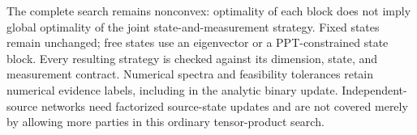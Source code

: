 The complete search remains nonconvex: optimality of each block does not
imply global optimality of the joint state-and-measurement strategy. Fixed
states remain unchanged; free states use an eigenvector or a PPT-constrained
state block. Every resulting strategy is checked against its dimension,
state, and measurement contract. Numerical spectra and feasibility tolerances
retain numerical evidence labels, including in the analytic binary update.
Independent-source networks need factorized source-state updates and are not
covered merely by allowing more parties in this ordinary tensor-product search.
